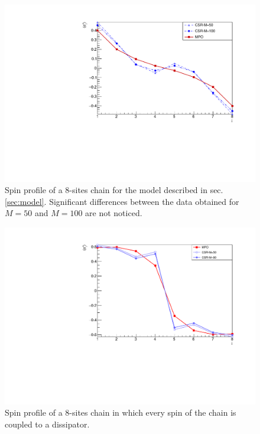 \begin{figure}[H]
    \centering
    \includegraphics[scale=0.7]{Figures/8sites/1U1D_comparisonCSR_MPO_8site.pdf}
    \captionsetup{width=1.\linewidth}
    \caption{Spin profile of a 8-sites chain for the model described in sec.\ref{sec:model}. Significant differences between the data obtained for $M=50$ and $M=100$ are not noticed.}
    \label{fig:1U1D_comparisonCSR_MPO_8site}
\end{figure}

\begin{figure}[H]
    \centering
    \includegraphics[scale=0.7]{Figures/8sites/8sites_MPOvsCORNER_4U4D.pdf}
    \captionsetup{width=1.\linewidth}
    \caption{Spin profile of a 8-sites chain in which every spin of the chain is coupled to a dissipator.}
    \label{fig:8sites_MPOvsCORNER_4U4D}
\end{figure}

